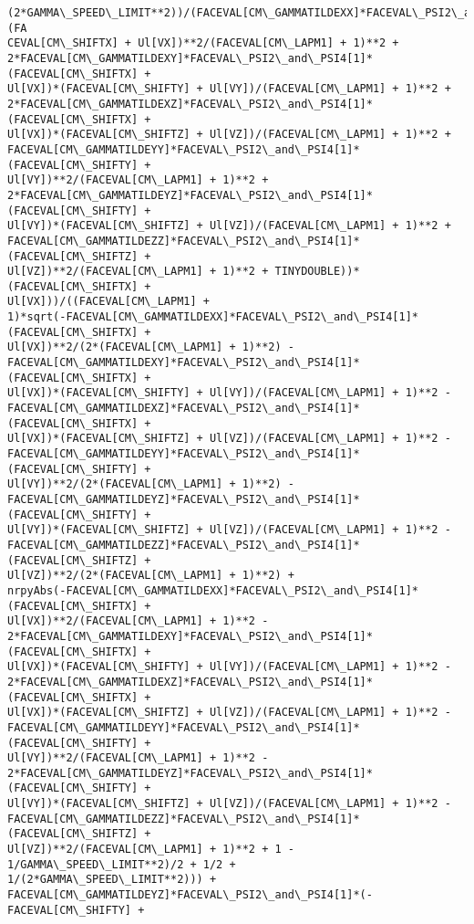 \documentclass[landscape,letterpaper,10pt,english]{article}
\begin{document}
\begin{Verbatim}[commandchars=\\\{\}]
(2*GAMMA\_SPEED\_LIMIT**2))/(FACEVAL[CM\_GAMMATILDEXX]*FACEVAL\_PSI2\_and\_PSI4[1]*(FA
CEVAL[CM\_SHIFTX] + Ul[VX])**2/(FACEVAL[CM\_LAPM1] + 1)**2 +
2*FACEVAL[CM\_GAMMATILDEXY]*FACEVAL\_PSI2\_and\_PSI4[1]*(FACEVAL[CM\_SHIFTX] +
Ul[VX])*(FACEVAL[CM\_SHIFTY] + Ul[VY])/(FACEVAL[CM\_LAPM1] + 1)**2 +
2*FACEVAL[CM\_GAMMATILDEXZ]*FACEVAL\_PSI2\_and\_PSI4[1]*(FACEVAL[CM\_SHIFTX] +
Ul[VX])*(FACEVAL[CM\_SHIFTZ] + Ul[VZ])/(FACEVAL[CM\_LAPM1] + 1)**2 +
FACEVAL[CM\_GAMMATILDEYY]*FACEVAL\_PSI2\_and\_PSI4[1]*(FACEVAL[CM\_SHIFTY] +
Ul[VY])**2/(FACEVAL[CM\_LAPM1] + 1)**2 +
2*FACEVAL[CM\_GAMMATILDEYZ]*FACEVAL\_PSI2\_and\_PSI4[1]*(FACEVAL[CM\_SHIFTY] +
Ul[VY])*(FACEVAL[CM\_SHIFTZ] + Ul[VZ])/(FACEVAL[CM\_LAPM1] + 1)**2 +
FACEVAL[CM\_GAMMATILDEZZ]*FACEVAL\_PSI2\_and\_PSI4[1]*(FACEVAL[CM\_SHIFTZ] +
Ul[VZ])**2/(FACEVAL[CM\_LAPM1] + 1)**2 + TINYDOUBLE))*(FACEVAL[CM\_SHIFTX] +
Ul[VX]))/((FACEVAL[CM\_LAPM1] +
1)*sqrt(-FACEVAL[CM\_GAMMATILDEXX]*FACEVAL\_PSI2\_and\_PSI4[1]*(FACEVAL[CM\_SHIFTX] +
Ul[VX])**2/(2*(FACEVAL[CM\_LAPM1] + 1)**2) -
FACEVAL[CM\_GAMMATILDEXY]*FACEVAL\_PSI2\_and\_PSI4[1]*(FACEVAL[CM\_SHIFTX] +
Ul[VX])*(FACEVAL[CM\_SHIFTY] + Ul[VY])/(FACEVAL[CM\_LAPM1] + 1)**2 -
FACEVAL[CM\_GAMMATILDEXZ]*FACEVAL\_PSI2\_and\_PSI4[1]*(FACEVAL[CM\_SHIFTX] +
Ul[VX])*(FACEVAL[CM\_SHIFTZ] + Ul[VZ])/(FACEVAL[CM\_LAPM1] + 1)**2 -
FACEVAL[CM\_GAMMATILDEYY]*FACEVAL\_PSI2\_and\_PSI4[1]*(FACEVAL[CM\_SHIFTY] +
Ul[VY])**2/(2*(FACEVAL[CM\_LAPM1] + 1)**2) -
FACEVAL[CM\_GAMMATILDEYZ]*FACEVAL\_PSI2\_and\_PSI4[1]*(FACEVAL[CM\_SHIFTY] +
Ul[VY])*(FACEVAL[CM\_SHIFTZ] + Ul[VZ])/(FACEVAL[CM\_LAPM1] + 1)**2 -
FACEVAL[CM\_GAMMATILDEZZ]*FACEVAL\_PSI2\_and\_PSI4[1]*(FACEVAL[CM\_SHIFTZ] +
Ul[VZ])**2/(2*(FACEVAL[CM\_LAPM1] + 1)**2) +
nrpyAbs(-FACEVAL[CM\_GAMMATILDEXX]*FACEVAL\_PSI2\_and\_PSI4[1]*(FACEVAL[CM\_SHIFTX] +
Ul[VX])**2/(FACEVAL[CM\_LAPM1] + 1)**2 -
2*FACEVAL[CM\_GAMMATILDEXY]*FACEVAL\_PSI2\_and\_PSI4[1]*(FACEVAL[CM\_SHIFTX] +
Ul[VX])*(FACEVAL[CM\_SHIFTY] + Ul[VY])/(FACEVAL[CM\_LAPM1] + 1)**2 -
2*FACEVAL[CM\_GAMMATILDEXZ]*FACEVAL\_PSI2\_and\_PSI4[1]*(FACEVAL[CM\_SHIFTX] +
Ul[VX])*(FACEVAL[CM\_SHIFTZ] + Ul[VZ])/(FACEVAL[CM\_LAPM1] + 1)**2 -
FACEVAL[CM\_GAMMATILDEYY]*FACEVAL\_PSI2\_and\_PSI4[1]*(FACEVAL[CM\_SHIFTY] +
Ul[VY])**2/(FACEVAL[CM\_LAPM1] + 1)**2 -
2*FACEVAL[CM\_GAMMATILDEYZ]*FACEVAL\_PSI2\_and\_PSI4[1]*(FACEVAL[CM\_SHIFTY] +
Ul[VY])*(FACEVAL[CM\_SHIFTZ] + Ul[VZ])/(FACEVAL[CM\_LAPM1] + 1)**2 -
FACEVAL[CM\_GAMMATILDEZZ]*FACEVAL\_PSI2\_and\_PSI4[1]*(FACEVAL[CM\_SHIFTZ] +
Ul[VZ])**2/(FACEVAL[CM\_LAPM1] + 1)**2 + 1 - 1/GAMMA\_SPEED\_LIMIT**2)/2 + 1/2 +
1/(2*GAMMA\_SPEED\_LIMIT**2))) +
FACEVAL[CM\_GAMMATILDEYZ]*FACEVAL\_PSI2\_and\_PSI4[1]*(-FACEVAL[CM\_SHIFTY] +

\end{Verbatim}
\end{document}
